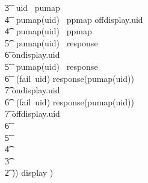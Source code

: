 \begin{circus}
        \t3 \circelse\ uid \in \dom~pumap \circthen \\
            \t4 \circif\ pumap(uid) \notin \dom~ppmap \circthen offdisplay.uid \then \Skip\\
            \t4 \circelse\ pumap(uid) \in \dom~ppmap \circthen \\
                \t5 \circif\ pumap(uid) \notin \dom~response \circthen \\
                    \t6 ondisplay.uid \then \Skip\\
                \t5 \circelse\ pumap(uid) \in \dom~response \circthen \\
                    \t6 \circif\ (fail~uid) \notin response(pumap(uid)) \circthen \\
                    \t7 ondisplay.uid \then \Skip\\
                    \t6 \circelse\ (fail~uid) \in response(pumap(uid)) \circthen \\
                    \t7 offdisplay.uid \then \Skip \\
                    \t6 \circfi \\
                \t5 \circfi \\
            \t4 \circfi \\
        \t3 \circfi \\
        \t2 )) \circhide \lchanset display \rchanset) \\

\end{circus}
